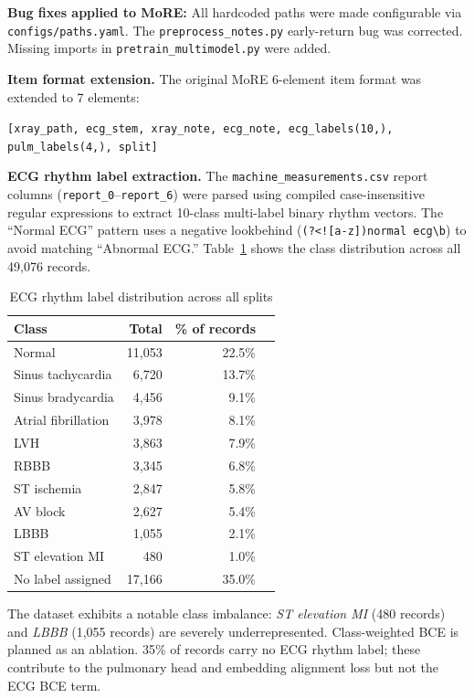 \documentclass[sigconf,nonacm]{acmart}
\begin{document}
\textbf{Bug fixes applied to MoRE:}
All hardcoded paths were made configurable via \texttt{configs/paths.yaml}.
The \texttt{preprocess\_notes.py} early-return bug was corrected.
Missing imports in \texttt{pretrain\_multimodel.py} were added.

\textbf{Item format extension.}
The original MoRE 6-element item format was extended to 7 elements:
\begin{center}
\texttt{[xray\_path, ecg\_stem, xray\_note, ecg\_note, ecg\_labels(10,), pulm\_labels(4,), split]}
\end{center}

\textbf{ECG rhythm label extraction.}
The \texttt{machine\_measurements.csv} report columns
(\texttt{report\_0}–\texttt{report\_6}) were parsed using compiled
case-insensitive regular expressions to extract 10-class multi-label
binary rhythm vectors. The ``Normal ECG'' pattern uses a negative
lookbehind (\texttt{(?<![a-z])normal ecg\textbackslash b}) to avoid
matching ``Abnormal ECG.'' Table~\ref{tab:ecg_class} shows the class
distribution across all 49,076 records.

\begin{table}[h]
\caption{ECG rhythm label distribution across all splits}
\label{tab:ecg_class}
\begin{tabular}{lrrr}
\toprule
Class & Total & \% of records \\
\midrule
Normal & 11,053 & 22.5\% \\
Sinus tachycardia & 6,720 & 13.7\% \\
Sinus bradycardia & 4,456 & 9.1\% \\
Atrial fibrillation & 3,978 & 8.1\% \\
LVH & 3,863 & 7.9\% \\
RBBB & 3,345 & 6.8\% \\
ST ischemia & 2,847 & 5.8\% \\
AV block & 2,627 & 5.4\% \\
LBBB & 1,055 & 2.1\% \\
ST elevation MI & 480 & 1.0\% \\
\midrule
No label assigned & 17,166 & 35.0\% \\
\bottomrule
\end{tabular}
\end{table}

The dataset exhibits a notable class imbalance: \textit{ST elevation MI}
(480 records) and \textit{LBBB} (1,055 records) are severely
underrepresented. Class-weighted BCE is planned as an ablation.
35\% of records carry no ECG rhythm label; these contribute to the
pulmonary head and embedding alignment loss but not the ECG BCE term.
\end{document}
